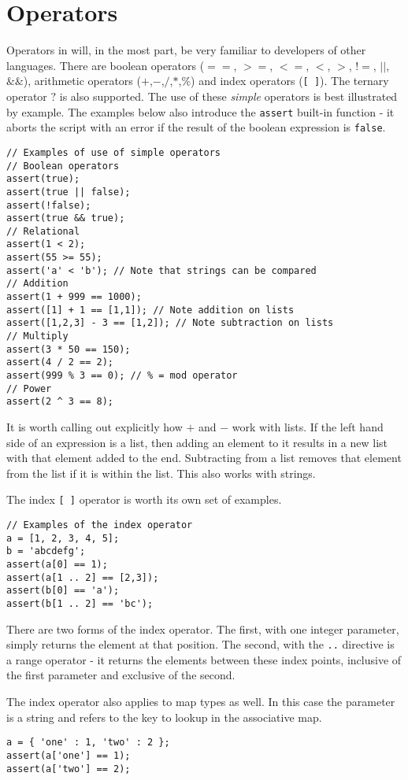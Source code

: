 \chapter{Operators}
Operators  in \Reflex will, in the most part, be very familiar to developers of other languages. There are boolean  operators ($==$, $>=$, $<=$, $<$, $>$, $!=$, $||$, $\&\&$), arithmetic  operators ($+$,$-$,$/$,$*$,$\%$) and index  operators (\Verb+[ ]+). The ternary  operator $?$ is also supported. The use of these \emph{simple} operators is best illustrated by example. The examples below also introduce the \verb+assert+ built-in function - it aborts the \Reflex script with an error if the result of the boolean expression is \verb+false+.
\begin{lstlisting}[caption={Simple operators}]
// Examples of use of simple operators
// Boolean operators
assert(true);
assert(true || false);
assert(!false);
assert(true && true);
// Relational
assert(1 < 2);
assert(55 >= 55);
assert('a' < 'b'); // Note that strings can be compared
// Addition
assert(1 + 999 == 1000);
assert([1] + 1 == [1,1]); // Note addition on lists
assert([1,2,3] - 3 == [1,2]); // Note subtraction on lists
// Multiply
assert(3 * 50 == 150);
assert(4 / 2 == 2);
assert(999 % 3 == 0); // % = mod operator
// Power
assert(2 ^ 3 == 8);
\end{lstlisting}
It is worth calling out explicitly how $+$ and $-$ work with lists. If the left hand side of an expression is a list, then adding an element to it results in a new list with that element added to the end. Subtracting from a list removes that element from the list if it is within the list. This also works with strings.

The index \Verb+[ ]+ operator is worth its own set of examples.
\begin{lstlisting}[caption={Index operator}]
// Examples of the index operator
a = [1, 2, 3, 4, 5];
b = 'abcdefg';
assert(a[0] == 1);
assert(a[1 .. 2] == [2,3]);
assert(b[0] == 'a');
assert(b[1 .. 2] == 'bc');
\end{lstlisting}
There are two forms of the index operator. The first, with one integer parameter, simply returns the element at that position. The second, with the \Verb+..+ directive is a range operator - it returns the elements between these index points, inclusive of the first parameter and exclusive of the second.

The index operator also applies to map types as well. In this case the parameter is a string and refers to the key to lookup in the associative map.
\begin{lstlisting}[caption={Index operator on maps}]
a = { 'one' : 1, 'two' : 2 };
assert(a['one'] == 1);
assert(a['two'] == 2);
\end{lstlisting}

